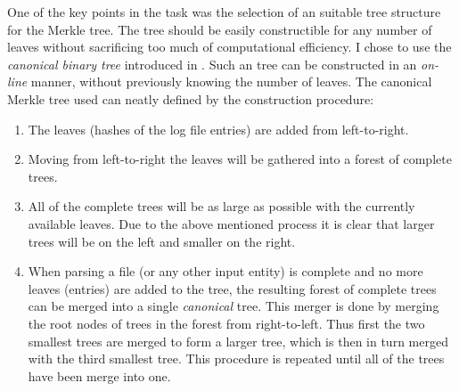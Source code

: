 \documentclass[11pt]{article}
\begin{document}
One of the key points in the task was the selection of an suitable tree structure for the Merkle tree. The tree should be easily constructible for any number of leaves without sacrificing too much of computational efficiency. I chose to use the \emph{canonical binary tree} introduced in \cite{Buldas2014}. Such an tree can be constructed in an \emph{on-line} manner, without previously knowing the number of leaves. The canonical Merkle tree used can neatly defined by the construction procedure:

\begin{enumerate}
 	
 	\item The leaves (hashes of the log file entries) are added from left-to-right.
 	
 	\item Moving from left-to-right the leaves will be gathered into a forest of complete trees.
 	
 	\item All of the complete trees will be as large as possible with the currently available leaves. Due to the above mentioned process it is clear that larger trees will be on the left and smaller on the right.

 	\item When parsing a file (or any other input entity) is complete and no more leaves (entries) are added to the tree, the resulting forest of complete trees can be merged into a single \emph{canonical} tree. This merger is done by merging the root nodes of trees in the forest from right-to-left. Thus first the two smallest trees are merged to form a larger tree, which is then in turn merged with the third smallest tree. This procedure is repeated until all of the trees have been merge into one.

\end{enumerate} 







\clearpage


\end{document}
